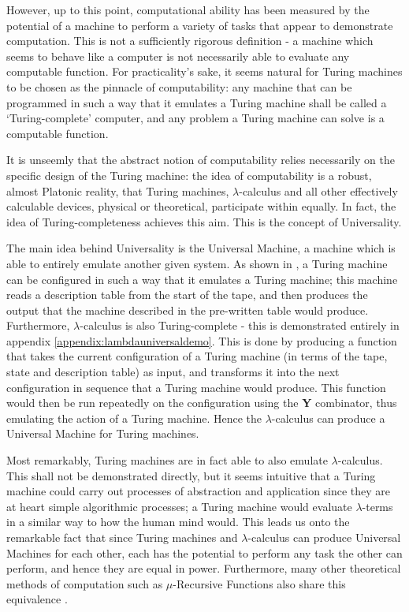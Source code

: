 \documentclass[Master.tex]{subfiles}
\begin{document}
However, up to this point, computational ability has been measured by the potential of a machine to perform a variety of tasks that appear to demonstrate computation. This is not a sufficiently rigorous definition - a machine which seems to behave like a computer is not necessarily able to evaluate any computable function. For practicality's sake, it seems natural for Turing machines to be chosen as the pinnacle of computability: any machine that can be programmed in such a way that it emulates a Turing machine shall be called a  `Turing-complete' computer, and any problem a Turing machine can solve is a computable function.

It is unseemly that the abstract notion of computability relies necessarily on the specific design of the Turing machine: the idea of computability is a robust, almost Platonic reality, that Turing machines, $\lambda$-calculus and all other effectively calculable devices, physical or theoretical, participate within equally. In fact, the idea of Turing-completeness achieves this aim. This is the concept of Universality.

The main idea behind Universality is the Universal Machine, a machine which is able to entirely emulate another given system. As shown in \cite{turing1936computablenumbers}, a Turing machine can be configured in such a way that it emulates a Turing machine; this machine reads a description table from the start of the tape, and then produces the output that the machine described in the pre-written table would produce. Furthermore, $\lambda$-calculus is also Turing-complete - this is demonstrated entirely in appendix \ref{appendix:lambdauniversaldemo}. This is done by producing a function that takes the current configuration of a Turing machine (in terms of the tape, state and description table) as input, and transforms it into the next configuration in sequence that a Turing machine would produce. This function would then be run repeatedly on the configuration using the \textbf{Y} combinator, thus emulating the action of a Turing machine. Hence the $\lambda$-calculus can produce a Universal Machine for Turing machines.

Most remarkably, Turing machines are in fact able to also emulate $\lambda$-calculus. This shall not be demonstrated directly, but it seems intuitive that a Turing machine could carry out processes of abstraction and application since they are at heart simple algorithmic processes; a Turing machine would evaluate $\lambda$-terms in a similar way to how the human mind would. This leads us onto the remarkable fact that since Turing machines and $\lambda$-calculus can produce Universal Machines for each other, each has the potential to perform any task the other can perform, and hence they are equal in power. Furthermore, many other theoretical methods of computation such as $\mu$-Recursive Functions also share this equivalence \cite{copeland2002ctt}.
\end{document}
